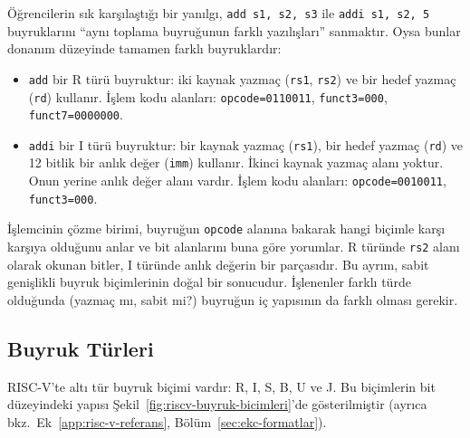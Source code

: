 Öğrencilerin sık karşılaştığı bir yanılgı, \texttt{add s1, s2, s3} ile \texttt{addi s1, s2, 5} buyruklarını ``aynı toplama buyruğunun farklı yazılışları'' sanmaktır. Oysa bunlar donanım düzeyinde tamamen farklı buyruklardır:

\begin{itemize}[nosep]
\item \texttt{add} bir R türü buyruktur: iki kaynak yazmaç (\texttt{rs1}, \texttt{rs2}) ve bir hedef yazmaç (\texttt{rd}) kullanır. İşlem kodu alanları: \texttt{opcode=0110011}, \texttt{funct3=000}, \texttt{funct7=0000000}.
\item \texttt{addi} bir I türü buyruktur: bir kaynak yazmaç (\texttt{rs1}), bir hedef yazmaç (\texttt{rd}) ve 12 bitlik bir anlık değer (\texttt{imm}) kullanır. İkinci kaynak yazmaç alanı yoktur. Onun yerine anlık değer alanı vardır. İşlem kodu alanları: \texttt{opcode=0010011}, \texttt{funct3=000}.
\end{itemize}

İşlemcinin çözme birimi, buyruğun \texttt{opcode} alanına bakarak hangi biçimle karşı karşıya olduğunu anlar ve bit alanlarını buna göre yorumlar. R türünde \texttt{rs2} alanı olarak okunan bitler, I türünde anlık değerin bir parçasıdır. Bu ayrım, sabit genişlikli buyruk biçimlerinin doğal bir sonucudur. İşlenenler farklı türde olduğunda (yazmaç mı, sabit mi?) buyruğun iç yapısının da farklı olması gerekir.

\subsection{Buyruk Türleri}

RISC-V'te altı tür buyruk biçimi vardır: R, I, S, B, U ve J. Bu biçimlerin bit düzeyindeki yapısı Şekil~\ref{fig:riscv-buyruk-bicimleri}'de gösterilmiştir (ayrıca bkz.\ Ek~\ref{app:risc-v-referans}, Bölüm~\ref{sec:ekc-formatlar}).

